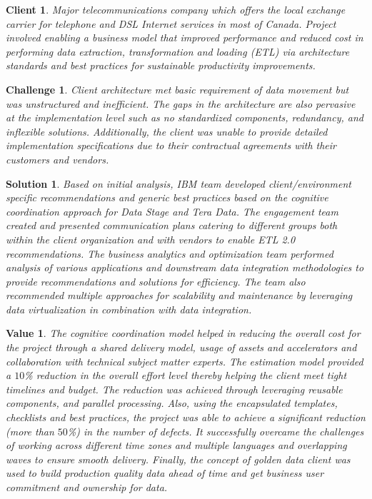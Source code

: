 \documentclass[10pt,journal,cspaper,compsoc]{IEEEtran}
\newtheorem{client}{Client}
\newtheorem{challenge}{Challenge}
\newtheorem{solution}{Solution}
\newtheorem{val}{Value}
\begin{document}
\begin{client}
Major telecommunications company which offers the local exchange carrier for telephone and 
DSL Internet services in most of Canada.  Project involved enabling a business model that improved performance and reduced cost in
performing data extraction, transformation and loading (ETL) via architecture standards and best practices for sustainable productivity improvements. 
\end{client}
\begin{challenge}
Client architecture met basic requirement of data movement but was unstructured and inefficient. The gaps in the architecture are 
also pervasive at the implementation level such as no standardized components, redundancy, and inflexible solutions.  Additionally, 
the client was unable to provide detailed implementation specifications due to their contractual agreements with their customers 
and vendors.
\end{challenge}
\begin{solution}
Based on initial analysis, IBM team developed client/environment specific recommendations and generic best practices based on the cognitive coordination 
approach for Data Stage and Tera Data. The engagement team created and presented communication plans catering to different groups 
both within the client organization and with vendors to enable ETL 2.0 recommendations. The business analytics and optimization
team performed analysis of various applications and downstream data integration methodologies to provide recommendations and 
solutions for efficiency. The team also recommended multiple approaches for scalability and maintenance by leveraging data virtualization 
in combination with data integration.
\end{solution}
\begin{val}
The cognitive coordination model helped in reducing the overall cost for the project through a shared delivery model, usage of assets and accelerators 
and collaboration with technical subject matter experts. The estimation model provided a $10$\% reduction in the overall 
effort level thereby helping the client meet tight timelines and budget. The reduction was achieved through leveraging reusable 
components, and parallel processing. Also, using the encapsulated templates, checklists and best practices, the project was able 
to achieve a significant reduction (more than $50$\%) in the number of defects. It successfully overcame the challenges of working 
across different time zones and multiple languages and overlapping waves to ensure smooth delivery. Finally, the concept of 
\emph{golden data client} was used to build production quality data ahead of time and get business user commitment and ownership for data.
\end{val}
\end{document}
